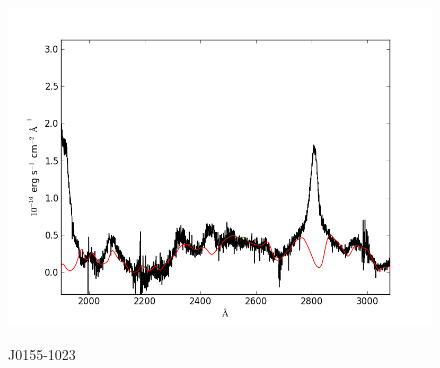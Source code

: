 \documentclass[usenatbib]{mn2e}
\begin{document}
\begin{figure}
\begin{center}
\vspace{5mm}
\includegraphics[width=0.49\linewidth,angle=0]{./red/fe_fit_SBB_0.png}\\

\end{center} 
\caption{J0155-1023 \label{fig:landscape}}   
\end{figure}

\newpage
\end{document}
